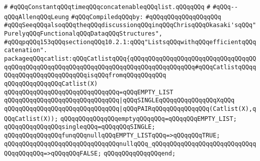 \label{src/lib/std/src/catlist.pkg}
\verb|#|\newline
\verb|#qQQqConstantqQQqtimeqQQqconcatenableqQQqlist.qQQqqQQq|\newline
\verb|#|\newline
\verb|#qQQq--qQQqAllenqQQqLeung|\newline
\newline
\verb|#qQQqCompiledqQQqby:|\newline
\verb|#qQQqqQQqqQQqqQQqqQQq|\newline
\newline
\verb|#qQQqSeeqQQqalsoqQQqtheqQQqdiscussionqQQqinqQQqChrisqQQqOkasaki'sqQQq"PurelyqQQqFunctionalqQQqDataqQQqStructures",|\newline
\verb|#qQQqpqQQq153qQQqsectionqQQq10.2.1:qQQq"ListsqQQqwithqQQqefficientqQQqcatenation".|\newline
\newline
\newline
\verb|packageqQQqcatlist:qQQqCatlistqQQq{qQQqqQQqqQQqqQQqqQQqqQQqqQQqqQQqqQQqqQQqqQQqqQQqqQQqqQQqqQQqqQQqqQQqqQQqqQQqqQQqqQQqqQQq#qQQqCatlistqQQqqQQqqQQqqQQqqQQqqQQqqQQqisqQQqfromqQQqqQQqqQQq|\newline
\newline
\verb|qQQqqQQqqQQqqQQqCatlist(X)|\newline
\verb|qQQqqQQqqQQqqQQqqQQqqQQqqQQqqQQq=qQQqEMPTY_LIST|\newline
\verb|qQQqqQQqqQQqqQQqqQQqqQQqqQQqqQQq|\verb#|qQQqSINGLEqQQqqQQqqQQqqQQqXqQQq#\newline
\verb|qQQqqQQqqQQqqQQqqQQqqQQqqQQqqQQq|\verb#|qQQqPAIRqQQqqQQqqQQqqQQq(Catlist(X),qQQqCatlist(X));#\newline
\newline
\verb|qQQqqQQqqQQqqQQqemptyqQQqqQQq=qQQqqQQqEMPTY_LIST;|\newline
\verb|qQQqqQQqqQQqqQQqsingleqQQq=qQQqqQQqSINGLE;|\newline
\newline
\verb|qQQqqQQqqQQqqQQqfunqQQqnullqQQqEMPTY_LISTqQQq=>qQQqqQQqTRUE;|\newline
\verb|qQQqqQQqqQQqqQQqqQQqqQQqqQQqqQQqnullqQQq_qQQqqQQqqQQqqQQqqQQqqQQqqQQqqQQqqQQqqQQq=>qQQqqQQqFALSE;|\newline
\verb|qQQqqQQqqQQqqQQqend;|\newline
\newline
